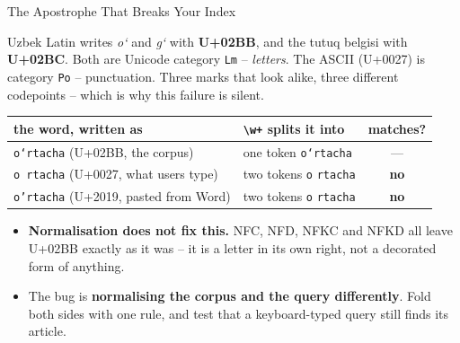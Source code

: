 \begin{frame}{The Apostrophe That Breaks Your Index}
\begin{rlpitfall}
Uzbek Latin writes \emph{o\textquoteleft} and \emph{g\textquoteleft} with \textbf{U+02BB}, and the tutuq belgisi with \textbf{U+02BC}. Both are Unicode category \texttt{Lm} -- \emph{letters}. The ASCII \texttt{} (U+0027) is category \texttt{Po} -- punctuation. Three marks that look alike, three different codepoints -- which is why this failure is silent.
\end{rlpitfall}
\pause
\small
\centering
\begin{tabular}{l|l|c}
the word, written as & \texttt{\textbackslash w+} splits it into & matches? \\
\hline
\texttt{o\textquoteleft rtacha} \;(U+02BB, the corpus) & one token \;\texttt{o\textquoteleft rtacha} & --- \\
\texttt{o\char39 rtacha} \;(U+0027, what users type)          & two tokens \;\texttt{o} \;\texttt{rtacha} & \textcolor{red!65!black}{\textbf{no}} \\
\texttt{o\textquoteright rtacha} \;(U+2019, pasted from Word) & two tokens \;\texttt{o} \;\texttt{rtacha} & \textcolor{red!65!black}{\textbf{no}} \\
\end{tabular}

\vspace{0.5em}
\raggedright
\pause
\begin{itemize}
  \item \textbf{Normalisation does not fix this.} NFC, NFD, NFKC and NFKD all leave U+02BB exactly as it was -- it is a letter in its own right, not a decorated form of anything.
  \pause
  \item The bug is \textbf{normalising the corpus and the query differently}. Fold both sides with one rule, and test that a keyboard-typed query still finds its article.
\end{itemize}
\end{frame}

